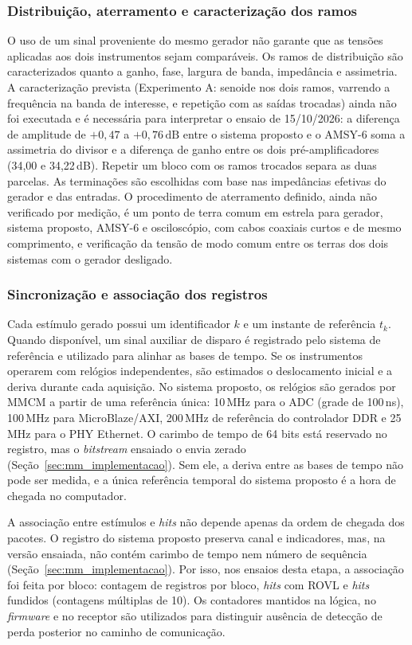 \subsubsection{Distribuição, aterramento e caracterização dos ramos}
O uso de um sinal proveniente do mesmo gerador não garante que as tensões aplicadas aos dois instrumentos sejam comparáveis. Os ramos de distribuição são caracterizados quanto a ganho, fase, largura de banda, impedância e assimetria. A caracterização prevista (Experimento A: senoide nos dois ramos, varrendo a frequência na banda de interesse, e repetição com as saídas trocadas) ainda não foi executada e é necessária para interpretar o ensaio de 15/10/2026: a diferença de amplitude de \(+0{,}47\) a \(+0{,}76\,\mathrm{dB}\) entre o sistema proposto e o AMSY-6 soma a assimetria do divisor e a diferença de ganho entre os dois pré-amplificadores (34,00 e 34,22\,dB). Repetir um bloco com os ramos trocados separa as duas parcelas. As terminações são escolhidas com base nas impedâncias efetivas do gerador e das entradas. O procedimento de aterramento definido, ainda não verificado por medição, é um ponto de terra comum em estrela para gerador, sistema proposto, AMSY-6 e osciloscópio, com cabos coaxiais curtos e de mesmo comprimento, e verificação da tensão de modo comum entre os terras dos dois sistemas com o gerador desligado.

\subsubsection{Sincronização e associação dos registros}
Cada estímulo gerado possui um identificador \(k\) e um instante de referência \(t_k\). Quando disponível, um sinal auxiliar de disparo é registrado pelo sistema de referência e utilizado para alinhar as bases de tempo. Se os instrumentos operarem com relógios independentes, são estimados o deslocamento inicial e a deriva durante cada aquisição. No sistema proposto, os relógios são gerados por MMCM a partir de uma referência única: 10\,MHz para o ADC (grade de 100\,ns), 100\,MHz para MicroBlaze/AXI, 200\,MHz de referência do controlador DDR e 25\,MHz para o PHY Ethernet. O carimbo de tempo de 64 bits está reservado no registro, mas o \textit{bitstream} ensaiado o envia zerado (Seção~\ref{sec:mm_implementacao}). Sem ele, a deriva entre as bases de tempo não pode ser medida, e a única referência temporal do sistema proposto é a hora de chegada no computador.

A associação entre estímulos e \textit{hits} não depende apenas da ordem de chegada dos pacotes. O registro do sistema proposto preserva canal e indicadores, mas, na versão ensaiada, não contém carimbo de tempo nem número de sequência (Seção~\ref{sec:mm_implementacao}). Por isso, nos ensaios desta etapa, a associação foi feita por bloco: contagem de registros por bloco, \textit{hits} com ROVL e \textit{hits} fundidos (contagens múltiplas de 10). Os contadores mantidos na lógica, no \textit{firmware} e no receptor são utilizados para distinguir ausência de detecção de perda posterior no caminho de comunicação.

